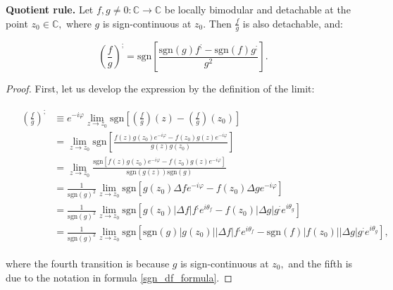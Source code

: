 \documentclass[11pt]{book}
\begin{document}
\begin{theorem}\textbf{Quotient rule.} Let $f,g\neq0:\mathbb{C}\longrightarrow\mathbb{C}$ be locally bimodular and detachable at the point $z_{0}\in\mathbb{C},$ where $g$ is sign-continuous at $z_{0}.$ Then $\frac{f}{g}$ is also detachable, and:

$$\left(\frac{f}{g}\right)^{;}=\text{sgn}\left[\frac{\text{sgn}\left(g\right)f^{;}-\text{sgn}\left(f\right)g^{;}}{g^{2}}\right].$$
\label{complex_quotient_rule}
\end{theorem}

\begin{proof}First, let us develop the expression by the definition of the limit:

\begin{align}
&\begin{aligned}
\left(\frac{f}{g}\right)^{;}
&\equiv e^{-i\varphi}\underset{z\to z_{0}}{\lim}\text{sgn}\left[\left(\frac{f}{g}\right)\left(z\right)-\left(\frac{f}{g}\right)\left(z_{0}\right)\right] \\
&=\underset{z\to z_{0}}{\lim}\text{sgn}\left[\frac{f\left(z\right)g\left(z_{0}\right)e^{-i\varphi}-f\left(z_{0}\right)g\left(z\right)e^{-i\varphi}}{g\left(z\right)g\left(z_{0}\right)}\right] \\
&=\underset{z\to z_{0}}{\lim}\frac{\text{sgn}\left[f\left(z\right)g\left(z_{0}\right)e^{-i\varphi}-f\left(z_{0}\right)g\left(z\right)e^{-i\varphi}\right]}{\text{sgn}\left(g\left(z\right)\right)\text{sgn}\left(g\right)} \\
&=\frac{1}{\text{sgn}\left(g\right)^{2}}\underset{z\to z_{0}}{\lim}\text{sgn}\left[g\left(z_{0}\right)\Delta fe^{-i\varphi}-f\left(z_{0}\right)\Delta ge^{-i\varphi}\right] \\
&=\frac{1}{\text{sgn}\left(g\right)^{2}}\underset{z\to z_{0}}{\lim}\text{sgn}\left[g\left(z_{0}\right)\left|\Delta f\right|f^{;}e^{i\theta_{f}}-f\left(z_{0}\right)\left|\Delta g\right|g^{;}e^{i\theta_{g}}\right] \\
&=\frac{1}{\text{sgn}\left(g\right)^{2}}\underset{z\to z_{0}}{\lim}\text{sgn}\left[\text{sgn}\left(g\right)\left|g\left(z_{0}\right)\right|\left|\Delta f\right|f^{;}e^{i\theta_{f}}-\text{sgn}\left(f\right)\left|f\left(z_{0}\right)\right|\left|\Delta g\right|g^{;}e^{i\theta_{g}}\right],
\end{aligned}
\end{align}

where the fourth transition is because $g$ is sign-continuous at $z_{0},$ and the fifth is due to the notation in formula \ref{sgn_df_formula}.


\end{proof}
\end{document}
